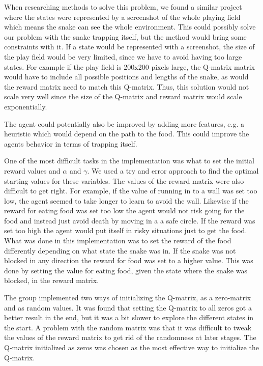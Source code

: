 \documentclass[fleqn,10pt]{SelfArx} %
\begin{document}
When researching methods to solve this problem, we found a similar project where the states were represented by a screenshot of the whole playing field which means the snake can see the whole environment. \cite{deep-q-snake} This could possibly solve our problem with the snake trapping itself, but the method would bring some constraints with it. If a state would be represented with a screenshot, the size of the play field would be very limited, since we have to avoid having too large states. For example if the play field is 200x200 pixels large, the Q-matrix matrix would have to include all possible positions and lengths of the snake, as would the reward matrix need to match this Q-matrix. Thus, this solution would not scale very well since the size of the Q-matrix and reward matrix would scale exponentially.

The agent could potentially also be improved by adding more features, e.g. a heuristic which would depend on the path to the food. This could improve the agents behavior in terms of trapping itself.

One of the most difficult tasks in the implementation was what to set the initial reward values and $\alpha$ and $\gamma$. We used a try and error approach to find the optimal starting values for these variables. The values of the reward matrix were also difficult to get right. For example, if the value of running in to a wall was set too low, the agent seemed to take longer to learn to avoid the wall. Likewise if the reward for eating food was set too low the agent would not risk going for the food and instead just avoid death by moving in a a safe circle. If the reward was set too high the agent would put itself in risky situations just to get the food. What was done in this implementation was to set the reward of the food differently depending on what state the snake was in. If the snake was not blocked in any direction the reward for food was set to a higher value. This was done by setting the value for eating food, given the state where the snake was blocked, in the reward matrix.

The group implemented two ways of initializing the Q-matrix, as a zero-matrix and as random values. It was found that setting the Q-matrix to all zeros got a better result in the end, but it was a bit slower to explore the different states in the start. A problem with the random matrix was that it was difficult to tweak the values of the reward matrix to get rid of the randomness at later stages. The Q-matrix initialized as zeros was chosen as the most effective way to initialize the Q-matrix.
\end{document}
